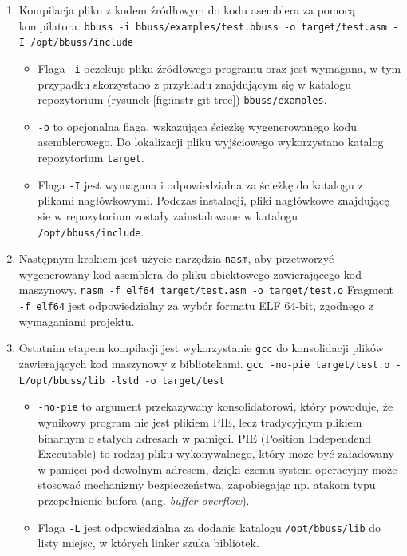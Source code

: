 \begin{enumerate}
    \raggedright
    \item Kompilacja pliku z kodem źródłowym do kodu asemblera za pomocą kompilatora.
    \break\verb|bbuss -i bbuss/examples/test.bbuss -o target/test.asm -I /opt/bbuss/include|
        \begin{itemize}
            \item Flaga \verb|-i| oczekuje pliku źródłowego programu oraz jest wymagana, w tym przypadku skorzystano z przykładu znajdującym się w katalogu repozytorium (rysunek \ref{fig:instr-git-tree}) \verb|bbuss/examples|.
            \item \verb|-o| to opcjonalna flaga, wskazująca ścieżkę wygenerowanego kodu asemblerowego. Do lokalizacji pliku wyjściowego wykorzystano katalog repozytorium \verb|target|.
            \item Flaga \verb|-I| jest wymagana i odpowiedzialna za ścieżkę do katalogu z plikami nagłówkowymi. Podczas instalacji, pliki nagłówkowe znajdującę sie w repozytorium zostały zainstalowane w katalogu \verb|/opt/bbuss/include|.
        \end{itemize}
    \item Następnym krokiem jest użycie narzędzia \verb|nasm|, aby przetworzyć wygenerowany kod asemblera do pliku obiektowego zawierającego kod maszynowy.
    \break\verb|nasm -f elf64 target/test.asm -o target/test.o|
    \break Fragment \verb|-f elf64| jest odpowiedzialny za wybór formatu ELF 64-bit, zgodnego z wymaganiami projektu.
    \newpage
    \item Ostatnim etapem kompilacji jest wykorzystanie \verb|gcc| do konsolidacji plików zawierających kod maszynowy z bibliotekami.
    \break\verb|gcc -no-pie target/test.o -L/opt/bbuss/lib -lstd -o target/test|
        \begin{itemize}
            \item \verb|-no-pie| to argument przekazywany konsolidatorowi, który powoduje, że wynikowy program nie jest plikiem PIE, lecz tradycyjnym plikiem binarnym o stałych adresach w pamięci. PIE (Position Independend Executable) to rodzaj pliku wykonywalnego, który może być załadowany w pamięci pod dowolnym adresem, dzięki czemu system operacyjny może stosować mechanizmy bezpieczeństwa, zapobiegając np. atakom typu przepełnienie bufora (ang. \textit{buffer overflow}). 
            \item Flaga \verb|-L| jest odpowiedzialna za dodanie katalogu \verb|/opt/bbuss/lib| do listy miejsc, w których linker szuka bibliotek.

\end{itemize}
\end{enumerate}
